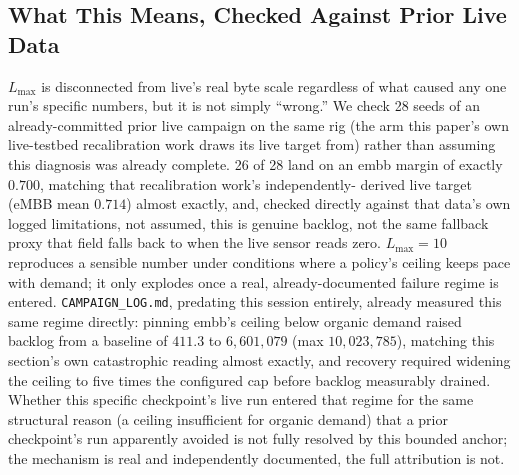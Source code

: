 \documentclass[journal]{IEEEtran}
\begin{document}
\subsection{What This Means, Checked Against Prior Live Data}
$L_{\max}$ is disconnected from live's real byte scale regardless of
what caused any one run's specific numbers, but it is not simply
``wrong.'' We check 28 seeds of an already-committed prior live
campaign on the same rig (the arm this paper's own live-testbed
recalibration work draws its live target from) rather than assuming
this diagnosis was already complete. 26 of 28 land on an embb margin
of exactly $0.700$, matching that recalibration work's independently-
derived live target (eMBB mean $0.714$) almost exactly, and, checked
directly against that data's own logged limitations, not assumed,
this is genuine backlog, not the same fallback proxy that field falls
back to when the live sensor reads zero. $L_{\max}=10$ reproduces a
sensible number under conditions where a policy's ceiling keeps pace
with demand; it only explodes once a real, already-documented failure
regime is entered. \texttt{CAMPAIGN\_LOG.md}, predating this session
entirely, already measured this same regime directly: pinning embb's
ceiling below organic demand raised backlog from a baseline of $411.3$
to $6{,}601{,}079$ (max $10{,}023{,}785$), matching this section's
own catastrophic reading almost exactly, and recovery required
widening the ceiling to five times the configured cap before backlog
measurably drained. Whether this specific checkpoint's live run entered
that regime for the same structural reason (a ceiling insufficient for
organic demand) that a prior checkpoint's run apparently avoided is not
fully resolved by this bounded anchor; the mechanism is real and
independently documented, the full attribution is not.
\end{document}
